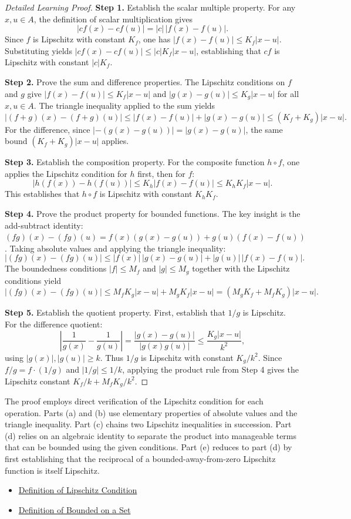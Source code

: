 \begin{proof}[Detailed Learning Proof]
\LRAProofBodyStart

\textbf{Step 1.} Establish the scalar multiple property.
For any $x, u \in A$, the definition of scalar multiplication gives
\[|cf(x) - cf(u)| = |c|\,|f(x) - f(u)|.\]
Since $f$ is Lipschitz with constant $K_f$, one has $|f(x) - f(u)| \leq K_f |x - u|$. Substituting yields $|cf(x) - cf(u)| \leq |c| K_f |x - u|$, establishing that $cf$ is Lipschitz with constant $|c|K_f$.

\textbf{Step 2.} Prove the sum and difference properties.
The Lipschitz conditions on $f$ and $g$ give $|f(x) - f(u)| \leq K_f|x - u|$ and $|g(x) - g(u)| \leq K_g|x - u|$ for all $x, u \in A$. The triangle inequality applied to the sum yields
\[|(f + g)(x) - (f + g)(u)| \leq |f(x) - f(u)| + |g(x) - g(u)| \leq (K_f + K_g)|x - u|.\]
For the difference, since $|{-}(g(x) - g(u))| = |g(x) - g(u)|$, the same bound $(K_f + K_g)|x - u|$ applies.

\textbf{Step 3.} Establish the composition property.
For the composite function $h \circ f$, one applies the Lipschitz condition for $h$ first, then for $f$:
\[|h(f(x)) - h(f(u))| \leq K_h |f(x) - f(u)| \leq K_h K_f |x - u|.\]
This establishes that $h \circ f$ is Lipschitz with constant $K_h K_f$.

\textbf{Step 4.} Prove the product property for bounded functions.
The key insight is the add-subtract identity: $(fg)(x) - (fg)(u) = f(x)(g(x) - g(u)) + g(u)(f(x) - f(u))$. Taking absolute values and applying the triangle inequality:
\[|(fg)(x) - (fg)(u)| \leq |f(x)|\,|g(x) - g(u)| + |g(u)|\,|f(x) - f(u)|.\]
The boundedness conditions $|f| \leq M_f$ and $|g| \leq M_g$ together with the Lipschitz conditions yield
\[|(fg)(x) - (fg)(u)| \leq M_f K_g |x - u| + M_g K_f |x - u| = (M_g K_f + M_f K_g)|x - u|.\]

\textbf{Step 5.} Establish the quotient property.
First, establish that $1/g$ is Lipschitz. For the difference quotient:
\[\left|\frac{1}{g(x)} - \frac{1}{g(u)}\right| = \frac{|g(x) - g(u)|}{|g(x)g(u)|} \leq \frac{K_g |x - u|}{k^2},\]
using $|g(x)|, |g(u)| \geq k$. Thus $1/g$ is Lipschitz with constant $K_g/k^2$. Since $f/g = f \cdot (1/g)$ and $|1/g| \leq 1/k$, applying the product rule from Step 4 gives the Lipschitz constant $K_f/k + M_f K_g/k^2$.
\end{proof}

\begin{remark*}
The proof employs direct verification of the Lipschitz condition for each operation. Parts (a) and (b) use elementary properties of absolute values and the triangle inequality. Part (c) chains two Lipschitz inequalities in succession. Part (d) relies on an algebraic identity to separate the product into manageable terms that can be bounded using the given conditions. Part (e) reduces to part (d) by first establishing that the reciprocal of a bounded-away-from-zero Lipschitz function is itself Lipschitz.
\end{remark*}

\begin{dependencies}
\begin{itemize}
  \item \hyperref[def:lipschitz-condition]{Definition of Lipschitz Condition}
  \item \hyperref[def:bounded-on-a-set]{Definition of Bounded on a Set}
\end{itemize}
\end{dependencies}

\clearpage
